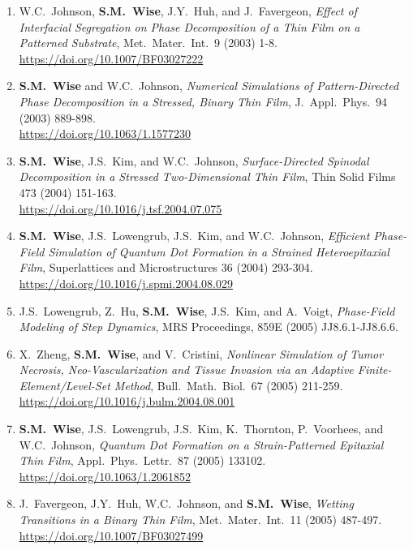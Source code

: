 \documentclass[11pt]{letter}
\begin{document}
\begin{enumerate}
    \item
W.C.~Johnson, \textbf{S.M.~Wise}, J.Y.~Huh, and J.~Favergeon, {\sl Effect of Interfacial Segregation on Phase Decomposition of a Thin Film on a Patterned Substrate}, Met.~Mater.~Int.~9 (2003) 1-8.
	\\
\url{https://doi.org/10.1007/BF03027222}

    \item
\textbf{S.M.~Wise} and W.C.~Johnson, {\sl Numerical Simulations of Pattern-Directed Phase Decomposition in a Stressed, Binary Thin Film}, J.~Appl.~Phys.~94 (2003) 889-898.
	\\
\url{https://doi.org/10.1063/1.1577230}

    \item
\textbf{S.M.~Wise}, J.S.~Kim, and W.C.~Johnson, {\sl Surface-Directed Spinodal Decomposition in a Stressed Two-Dimensional Thin Film}, Thin Solid Films 473 (2004) 151-163.
	\\
\url{https://doi.org/10.1016/j.tsf.2004.07.075}

    \item
\textbf{S.M.~Wise}, J.S.~Lowengrub, J.S.~Kim, and W.C.~Johnson, {\sl Efficient Phase-Field Simulation of Quantum Dot Formation in a Strained Heteroepitaxial Film}, Superlattices and Microstructures 36 (2004) 293-304.
	\\
\url{https://doi.org/10.1016/j.spmi.2004.08.029}

    \item
J.S.~Lowengrub, Z.~Hu, \textbf{S.M.~Wise}, J.S.~Kim, and A.~Voigt, {\sl Phase-Field Modeling of Step Dynamics}, MRS Proceedings, 859E (2005) JJ8.6.1-JJ8.6.6.

    \item
X.~Zheng, \textbf{S.M.~Wise}, and V.~Cristini, {\sl Nonlinear Simulation of Tumor Necrosis, Neo-Vascularization and Tissue Invasion via an Adaptive Finite-Element/Level-Set Method}, Bull.~Math.~Biol.~67 (2005) 211-259.
	\\
\url{https://doi.org/10.1016/j.bulm.2004.08.001}

    \item
\textbf{S.M.~Wise}, J.S.~Lowengrub, J.S.~Kim, K.~Thornton, P.~Voorhees, and W.C.~Johnson, {\sl Quantum Dot Formation on a Strain-Patterned Epitaxial Thin Film}, Appl.~Phys.~Lettr.~87 (2005) 133102.
	\\
\url{https://doi.org/10.1063/1.2061852}

	\item
J.~Favergeon, J.Y.~Huh, W.C.~Johnson, and \textbf{S.M.~Wise}, {\sl Wetting Transitions in a Binary Thin Film}, Met.~Mater.~Int.~11 (2005) 487-497.
	\\
\url{https://doi.org/10.1007/BF03027499}


\end{enumerate}
\end{document}
